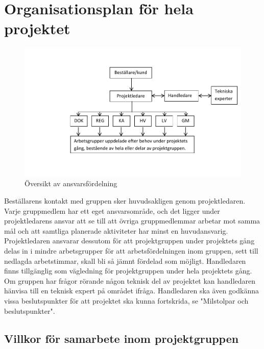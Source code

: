 \documentclass[a4paper,12pt]{article}
\begin{document}
\section{Organisationsplan för hela projektet}	%
\begin{figure}[h]
        \includegraphics{organisation-figur.pdf}
	\caption{Översikt av ansvarsfördelning}
\end{figure}
Beställarens kontakt med gruppen sker huvudsakligen genom projektledaren. Varje gruppmedlem har ett eget ansvarsområde, och det ligger under projektledarens ansvar att se till att övriga gruppmedlemmar arbetar mot samma mål och att samtliga planerade aktiviteter har minst en huvudansvarig. Projektledaren ansvarar dessutom för att projektgruppen under projektets gång  delas in i mindre arbetsgrupper för att arbetsfördelningen inom gruppen, sett till nedlagda arbetstimmar,  skall bli så jämnt fördelad som möjligt.
Handledaren finns tillgänglig som vägledning för projektgruppen under hela projektets gång. Om gruppen har frågor rörande någon teknisk del av projektet kan handledaren hänvisa till en teknisk expert på området ifråga. Handledaren ska även godkänna vissa beslutspunkter för att projektet ska kunna fortskrida, se "Milstolpar och beslutspunkter".

\subsection{Villkor för samarbete inom projektgruppen}
\end{document}

